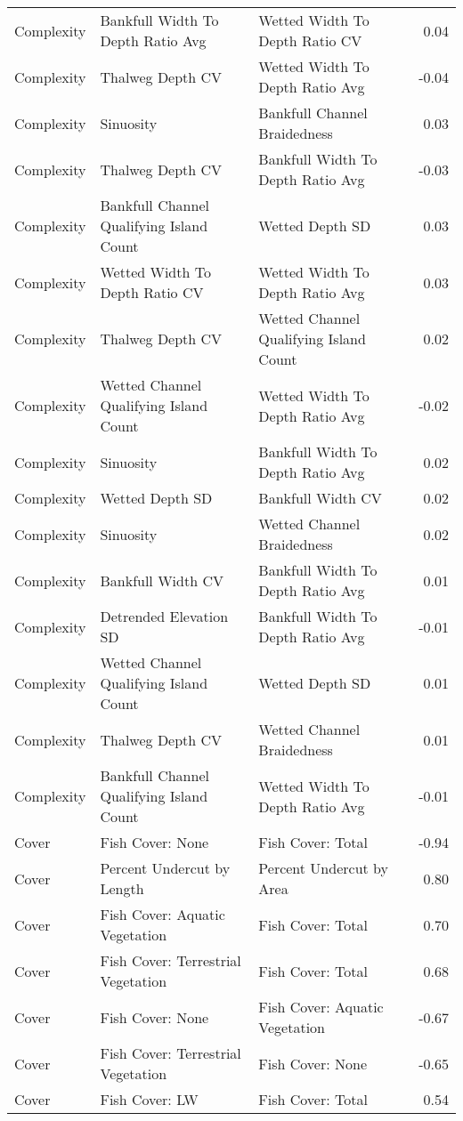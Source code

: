 \documentclass[
  12pt,
]{article}
\begin{document}
\begin{longtable}[t]{>{\raggedright\arraybackslash}p{1in}>{\raggedright\arraybackslash}p{2in}>{\raggedright\arraybackslash}p{2in}r}
\addlinespace
Complexity & Bankfull Width To Depth Ratio Avg & Wetted Width To Depth Ratio CV & 0.04\\
Complexity & Thalweg Depth CV & Wetted Width To Depth Ratio Avg & -0.04\\
Complexity & Sinuosity & Bankfull Channel Braidedness & 0.03\\
Complexity & Thalweg Depth CV & Bankfull Width To Depth Ratio Avg & -0.03\\
Complexity & Bankfull Channel Qualifying Island Count & Wetted Depth SD & 0.03\\
\addlinespace
Complexity & Wetted Width To Depth Ratio CV & Wetted Width To Depth Ratio Avg & 0.03\\
Complexity & Thalweg Depth CV & Wetted Channel Qualifying Island Count & 0.02\\
Complexity & Wetted Channel Qualifying Island Count & Wetted Width To Depth Ratio Avg & -0.02\\
Complexity & Sinuosity & Bankfull Width To Depth Ratio Avg & 0.02\\
Complexity & Wetted Depth SD & Bankfull Width CV & 0.02\\
\addlinespace
Complexity & Sinuosity & Wetted Channel Braidedness & 0.02\\
Complexity & Bankfull Width CV & Bankfull Width To Depth Ratio Avg & 0.01\\
Complexity & Detrended Elevation SD & Bankfull Width To Depth Ratio Avg & -0.01\\
Complexity & Wetted Channel Qualifying Island Count & Wetted Depth SD & 0.01\\
Complexity & Thalweg Depth CV & Wetted Channel Braidedness & 0.01\\
\addlinespace
Complexity & Bankfull Channel Qualifying Island Count & Wetted Width To Depth Ratio Avg & -0.01\\
\hline
Cover & Fish Cover: None & Fish Cover: Total & -0.94\\
Cover & Percent Undercut by Length & Percent Undercut by Area & 0.80\\
Cover & Fish Cover: Aquatic Vegetation & Fish Cover: Total & 0.70\\
Cover & Fish Cover: Terrestrial Vegetation & Fish Cover: Total & 0.68\\
\addlinespace
Cover & Fish Cover: None & Fish Cover: Aquatic Vegetation & -0.67\\
Cover & Fish Cover: Terrestrial Vegetation & Fish Cover: None & -0.65\\
Cover & Fish Cover: LW & Fish Cover: Total & 0.54\\

\end{longtable}
\end{document}
